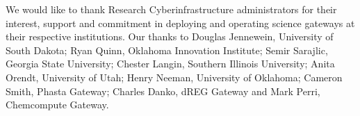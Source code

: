\documentclass[sigconf]{acmart}
\begin{document}
\begin{acks}
We would like to thank Research Cyberinfrastructure administrators for their interest, support and commitment in deploying and operating science gateways at their respective institutions. Our thanks to Douglas Jennewein, University of South Dakota; Ryan Quinn, Oklahoma Innovation Institute; Semir Sarajlic, Georgia State University; Chester Langin, Southern Illinois University; Anita Orendt, University of Utah; Henry Neeman, University of Oklahoma; Cameron Smith, Phasta Gateway; Charles Danko, dREG Gateway and Mark Perri, Chemcompute Gateway. 

\end{acks}



\end{document}
